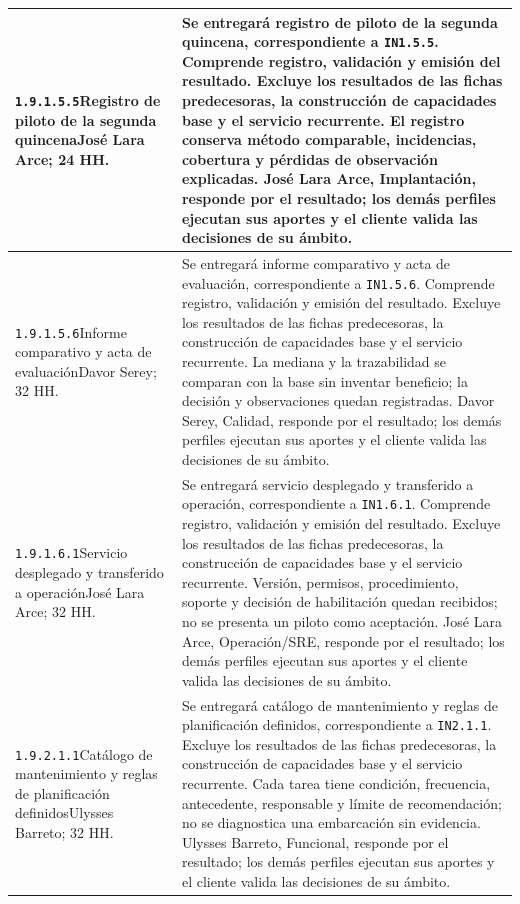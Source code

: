 \begin{longtable}{L{52mm}L{91mm}}
\texttt{1.\allowbreak{}9.\allowbreak{}1.\allowbreak{}5.\allowbreak{}5}\newline Registro de piloto de la segunda quincena\newline José Lara Arce; 24 HH. & Se entregará registro de piloto de la segunda quincena, correspondiente a \texttt{IN1.5.5}. Comprende registro, validación y emisión del resultado. Excluye los resultados de las fichas predecesoras, la construcción de capacidades base y el servicio recurrente.  El registro conserva método comparable, incidencias, cobertura y pérdidas de observación explicadas. José Lara Arce, Implantación, responde por el resultado; los demás perfiles ejecutan sus aportes y el cliente valida las decisiones de su ámbito.\\\hline
\texttt{1.\allowbreak{}9.\allowbreak{}1.\allowbreak{}5.\allowbreak{}6}\newline Informe comparativo y acta de evaluación\newline Davor Serey; 32 HH. & Se entregará informe comparativo y acta de evaluación, correspondiente a \texttt{IN1.5.6}. Comprende registro, validación y emisión del resultado. Excluye los resultados de las fichas predecesoras, la construcción de capacidades base y el servicio recurrente.  La mediana y la trazabilidad se comparan con la base sin inventar beneficio; la decisión y observaciones quedan registradas. Davor Serey, Calidad, responde por el resultado; los demás perfiles ejecutan sus aportes y el cliente valida las decisiones de su ámbito.\\\hline
\texttt{1.\allowbreak{}9.\allowbreak{}1.\allowbreak{}6.\allowbreak{}1}\newline Servicio desplegado y transferido a operación\newline José Lara Arce; 32 HH. & Se entregará servicio desplegado y transferido a operación, correspondiente a \texttt{IN1.6.1}. Comprende registro, validación y emisión del resultado. Excluye los resultados de las fichas predecesoras, la construcción de capacidades base y el servicio recurrente.  Versión, permisos, procedimiento, soporte y decisión de habilitación quedan recibidos; no se presenta un piloto como aceptación. José Lara Arce, Operación/SRE, responde por el resultado; los demás perfiles ejecutan sus aportes y el cliente valida las decisiones de su ámbito.\\\hline
\texttt{1.\allowbreak{}9.\allowbreak{}2.\allowbreak{}1.\allowbreak{}1}\newline Catálogo de mantenimiento y reglas de planificación definidos\newline Ulysses Barreto; 32 HH. & Se entregará catálogo de mantenimiento y reglas de planificación definidos, correspondiente a \texttt{IN2.1.1}. Excluye los resultados de las fichas predecesoras, la construcción de capacidades base y el servicio recurrente.  Cada tarea tiene condición, frecuencia, antecedente, responsable y límite de recomendación; no se diagnostica una embarcación sin evidencia. Ulysses Barreto, Funcional, responde por el resultado; los demás perfiles ejecutan sus aportes y el cliente valida las decisiones de su ámbito.\\\hline

\end{longtable}
